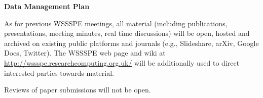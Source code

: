 \documentclass[11pt]{article}
\begin{document}
\newpage

{\bf Data Management Plan}

As for previous WSSSPE meetings, all material (including publications, presentations, meeting minutes, real time discussions) will be open, hosted and archived on existing public platforms and journals (e.g., Slideshare, arXiv, Google Docs, Twitter). The WSSSPE web page and wiki at \url{http://wssspe.researchcomputing.org.uk/} will be additionally used to direct interested parties towards material.

Reviews of paper submissions will not be open. 
\end{document}
